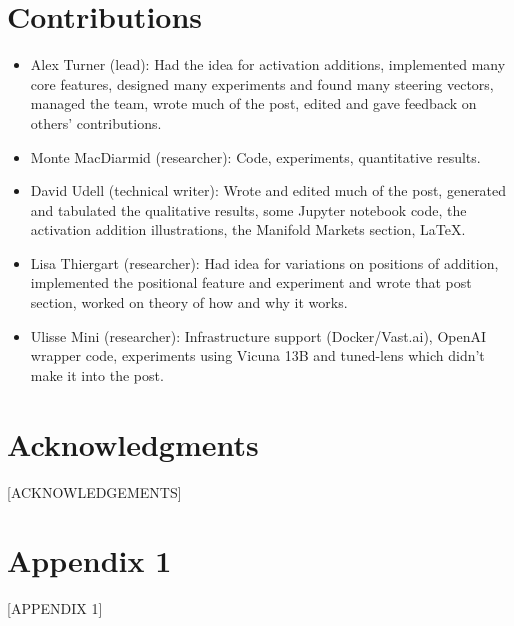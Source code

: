 \documentclass[10pt]{article}
\begin{document}
\section*{Contributions}
\begin{itemize}
\item Alex Turner (lead): Had the idea for activation additions, implemented many core features, designed many experiments and found many steering vectors, managed the team, wrote much of the post, edited and gave feedback on others' contributions. 
\item Monte MacDiarmid (researcher): Code, experiments, quantitative results.
\item David Udell (technical writer): Wrote and edited much of the post, generated and tabulated the qualitative results, some Jupyter notebook code, the activation addition illustrations, the Manifold Markets section, \LaTeX.
\item Lisa Thiergart (researcher): Had idea for variations on positions of addition, implemented the positional feature and experiment and wrote that post section, worked on theory of how and why it works.
\item Ulisse Mini (researcher): Infrastructure support (Docker/Vast.ai), OpenAI wrapper code, experiments using Vicuna 13B and tuned-lens which didn't make it into the post.
\end{itemize}

\section*{Acknowledgments}
[ACKNOWLEDGEMENTS]





\newpage
\appendix
\onecolumn
\section{Appendix 1}
[APPENDIX 1]
\end{document}
